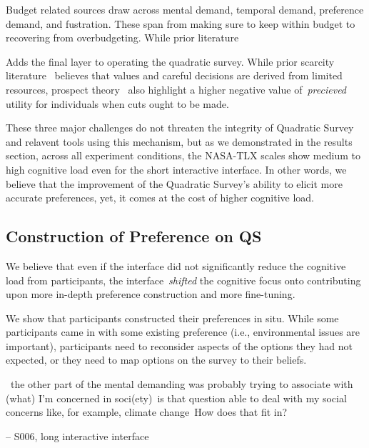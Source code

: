 Budget related sources draw across mental demand, temporal demand, preference demand, and fustration. These span from making sure to keep within budget to recovering from overbudgeting. While prior literature 

Adds the final layer to operating the quadratic survey. While prior scarcity literature~\cite{Shah2015a} believes that values and careful decisions are derived from limited resources, prospect theory~\cite{kahnemanProspectTheoryAnalysis1979} also highlight a higher negative value of~\textit{precieved} utility for individuals when cuts ought to be made.

These three major challenges do not threaten the integrity of Quadratic Survey and relavent tools using this mechanism, but as we demonstrated in the results section, across all experiment conditions, the NASA-TLX scales show medium to high cognitive load even for the short interactive interface. In other words, we believe that the improvement of the Quadratic Survey's ability to elicit more accurate preferences, yet, it comes at the cost of higher cognitive load.


\subsection{Construction of Preference on QS}

We believe that even if the interface did not significantly reduce the cognitive load from participants, the interface~\textit{shifted} the cognitive focus onto contributing upon more in-depth preference construction and more fine-tuning.

We show that participants constructed their preferences in situ. While some participants came in with some existing preference (i.e., environmental issues are important), participants need to reconsider aspects of the options they had not expected, or they need to map options on the survey to their beliefs.

\begin{displayquote}

~\bracketellipsis the other part of the mental demanding was probably trying to associate with (what) I'm concerned in soci(ety)~\bracketellipsis is that question able to deal with my social concerns like, for example, climate change~\bracketellipsis How does that fit in?

\noindent \hfill -- S006, long interactive interface
\end{displayquote}

